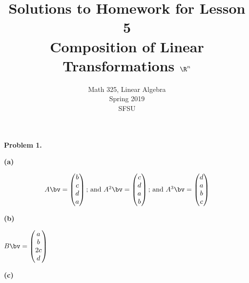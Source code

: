 \documentclass[oneside,12pt]{amsart}
\begin{document}
\title{Solutions to Homework for Lesson 5 \\ Composition of Linear Transformations $\R^n$}
\author{Math 325, Linear Algebra \\  Spring 2019 \\ SFSU }
\date{}

\maketitle

\textbf{Problem 1.}

\textbf{(a)}

$$
\begin{matrix}
A \bv =
\begin{pmatrix}
b \\
c \\
d \\
a \\
\end{pmatrix}
\text{; and }
A^2\bv =
\begin{pmatrix}
c \\
d \\
a \\
b \\
\end{pmatrix}
\text{; and }
A^3\bv =
\begin{pmatrix}
d \\
a \\
b \\
c \\
\end{pmatrix}
\end{matrix}
$$


\textbf{(b)}

$
B\bv =
\begin{pmatrix}
a \\
b \\
2c \\
d \\
\end{pmatrix}
$


\textbf{(c)}
\end{document}
